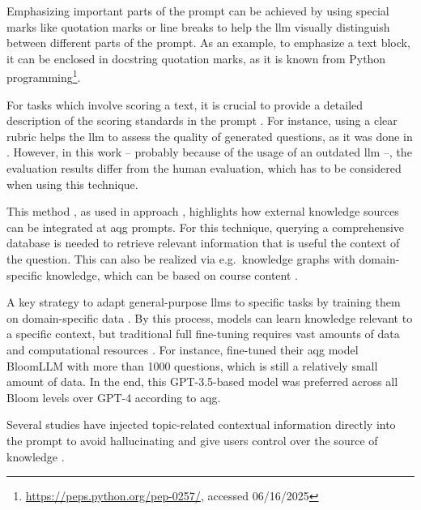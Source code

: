  Emphasizing important parts of the prompt can be achieved by using special marks like quotation marks or line breaks \cite{zhao_survey_2025} to help the \ac{llm} visually distinguish between different parts of the prompt. As an example, to emphasize a text block, it can be enclosed in docstring quotation marks, as it is known from Python programming\footnote{\url{https://peps.python.org/pep-0257/}, accessed 06/16/2025}.


 For tasks which involve scoring a text, it is crucial to provide a detailed description of the scoring standards in the prompt \cite{zhao_survey_2025}. For instance, using a clear rubric helps the \ac{llm} to assess the quality of generated questions, as it was done in \cite{scaria_automated_2024}. However, in this work -- probably because of the usage of an outdated \ac{llm} --, the evaluation results differ from the human evaluation, which has to be considered when using this technique.

 This method \cite{lewis_retrieval-augmented_2020}, as used in approach \cite{hang_mcqgen_2024}, highlights how external knowledge sources can be integrated at \ac{aqg} prompts. For this technique, querying a comprehensive database is needed to retrieve relevant information that is useful the context of the question. This can also be realized via e.g.\ knowledge graphs with domain-specific knowledge, which can be based on course content \cite{yang_heuristic_2024}.

 A key strategy to adapt general-purpose \ac{llms} to specific tasks by training them on domain-specific data \cite{hou_large_2024}. By this process, models can learn knowledge relevant to a specific context, but traditional full fine-tuning requires vast amounts of data and computational resources \cite{hou_large_2024}. For instance, \cite{duong-trung_bloomllm_2024} fine-tuned their \ac{aqg} model BloomLLM with more than 1000 questions, which is still a relatively small amount of data. In the end, this GPT-3.5-based model was preferred across all Bloom levels over GPT-4 according to \ac{aqg}.

 Several studies \cite{biancini_multiple-choice_2024,blobstein_angel_2023,bhowmick_automating_2023} have injected topic-related contextual information directly into the prompt to avoid hallucinating and give users control over the source of knowledge \cite{biancini_multiple-choice_2024}. 

